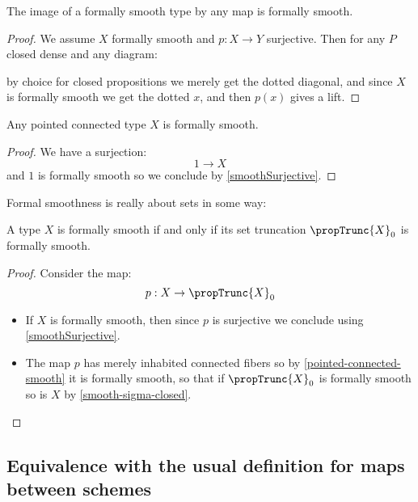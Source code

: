 \begin{proposition}
\label{smoothSurjective}
The image of a formally smooth type by any map is formally smooth.
\end{proposition}
\begin{proof}
We assume $X$ formally smooth and $p:X\to Y$ surjective. Then for any $P$ closed dense and any diagram:
 \begin{center}
    \end{center} 
    by choice for closed propositions we merely get the dotted diagonal, and since $X$ is formally smooth we get the dotted $x$, and then $p(x)$ gives a lift.
\end{proof}

\begin{lemma}\label{pointed-connected-smooth}
Any pointed connected type $X$ is formally smooth.
\end{lemma}

\begin{proof}
We have a surjection:
\[1\to X\]
and $1$ is formally smooth so we conclude by \cref{smoothSurjective}.
\end{proof}

Formal smoothness is really about sets in some way:

\begin{lemma}
A type $X$ is formally smooth if and only if its set truncation $\propTrunc{X}_0$ is formally smooth.
\end{lemma}

\begin{proof}
Consider the map:
\[p:X\to \propTrunc{X}_0\]
\begin{itemize}
\item If $X$ is formally smooth, then since $p$ is surjective we conclude using \cref{smoothSurjective}.
\item The map $p$ has merely inhabited connected fibers so by \cref{pointed-connected-smooth} it is formally smooth, so that if $\propTrunc{X}_0$ is formally smooth so is $X$ by \cref{smooth-sigma-closed}.
\end{itemize}
\end{proof}


\subsection{Equivalence with the usual definition for maps between schemes}

